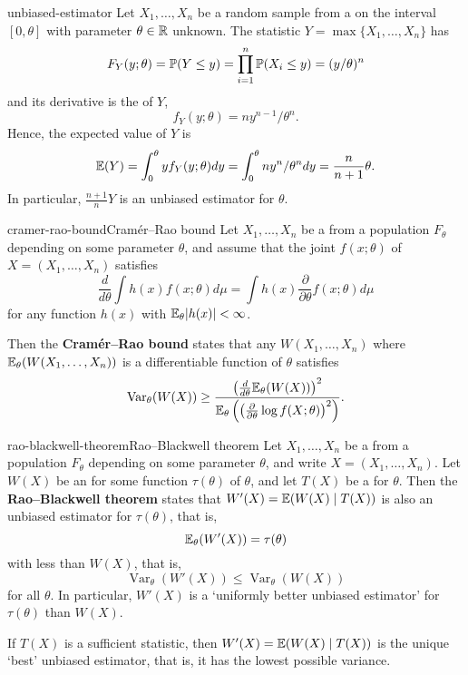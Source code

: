 \begin{example}{unbiased-estimator}
    Let $X_1, \ldots, X_n$ be a random sample from a  on the interval $[0, \theta]$ with parameter $\theta \in \mathbb{R}$ unknown. The statistic $Y = \max \{ X_1, \ldots, X_n \}$ has 
    \[ F_Y(y; \theta) = \mathbb{P}(Y \le y) = \prod_{i = 1}^{n} \mathbb{P}(X_i \le y) = (y / \theta)^n \]
    and its derivative is the  of $Y$,
    \[ f_Y(y; \theta) = n y^{n - 1} / \theta^n . \]
    Hence, the expected value of $Y$ is
    \[ \mathbb{E}(Y) = \int_0^\theta y f_Y(y; \theta) dy = \int_0^\theta n y^n / \theta^n dy = \frac{n}{n + 1} \theta . \]
    In particular, $\frac{n + 1}{n} Y$ is an unbiased estimator for $\theta$.
\end{example}

\begin{topic}{cramer-rao-bound}{Cramér--Rao bound}
    Let $X_1, \ldots, X_n$ be a  from a population $F_\theta$ depending on some parameter $\theta$, and assume that the joint  $f(x; \theta)$ of $X = (X_1, \ldots, X_n)$ satisfies
    \[ \frac{d}{d \theta} \int h(x) f(x; \theta) d \mu = \int h(x) \frac{\partial}{\partial \theta} f(x; \theta) d \mu \]
    for any function $h(x)$ with $\mathbb{E}_\theta |h(x)| < \infty$.
    
    Then the \textbf{Cramér--Rao bound} states that any  $W(X_1, \ldots, X_n)$ where $\mathbb{E}_\theta(W(X_1, \ldots, X_n))$ is a differentiable function of $\theta$ satisfies
    \[ \operatorname{Var}_\theta(W(X)) \ge \frac{\left( \frac{d}{d \theta} \mathbb{E}_\theta(W(X)) \right)^2}{\mathbb{E}_\theta\left(\left(\frac{\partial}{\partial \theta} \log f(X; \theta)\right)^2\right)} . \]
\end{topic}

\begin{topic}{rao-blackwell-theorem}{Rao--Blackwell theorem}
    Let $X_1, \ldots, X_n$ be a  from a population $F_\theta$ depending on some parameter $\theta$, and write $X = (X_1, \ldots, X_n)$. Let $W(X)$ be an  for some function $\tau(\theta)$ of $\theta$, and let $T(X)$ be a  for $\theta$. Then the \textbf{Rao--Blackwell theorem} states that $W'(X) = \mathbb{E}(W(X) \mid T(X))$ is also an unbiased estimator for $\tau(\theta)$, that is,
    \[ \mathbb{E}_\theta(W'(X)) = \tau(\theta) \]
    with less  than $W(X)$, that is,
    \[ \operatorname{Var}_\theta(W'(X)) \le \operatorname{Var}_\theta(W(X)) \]
    for all $\theta$. In particular, $W'(X)$ is a `uniformly better unbiased estimator' for $\tau(\theta)$ than $W(X)$.

    If $T(X)$ is a  sufficient statistic, then $W'(X) = \mathbb{E}(W(X) \mid T(X))$ is the unique `best' unbiased estimator, that is, it has the lowest possible variance.
\end{topic}

